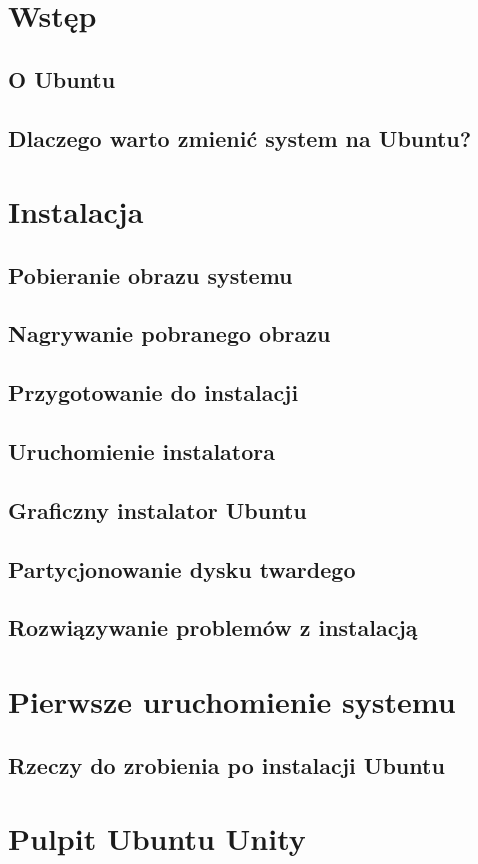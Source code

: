 \documentclass[a4paper,11pt,oneside]{mwart}
\begin{document}


\section{Wstęp}
	
	\subsection{O Ubuntu}
		
	\subsection{Dlaczego warto zmienić system na Ubuntu?}
		
\section{Instalacja}
	\subsection{Pobieranie obrazu systemu}
		
	\subsection{Nagrywanie pobranego obrazu}
		
		
	\subsection{Przygotowanie do instalacji}
		
	\subsection{Uruchomienie instalatora}
		
	\subsection{Graficzny instalator Ubuntu}
		
	\subsection{Partycjonowanie dysku twardego}
		
	\subsection{Rozwiązywanie problemów z instalacją}
\section{Pierwsze uruchomienie systemu}
	\subsection{Rzeczy do zrobienia po instalacji Ubuntu}
	\label{sec:rzeczy_do_zrobienia_po_instalacji}
\section{Pulpit Ubuntu Unity}

\end{document}
